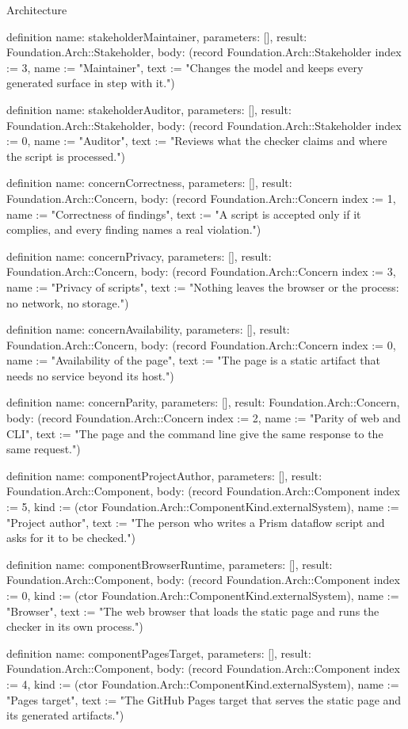 \begin{lexlean}{Architecture}
\begin{semanticmodule}
definition{
  name: stakeholderMaintainer,
  parameters: [],
  result: Foundation.Arch::Stakeholder,
  body: (record Foundation.Arch::Stakeholder {index := 3, name := "Maintainer", text := "Changes the model and keeps every generated surface in step with it."})
}

definition{
  name: stakeholderAuditor,
  parameters: [],
  result: Foundation.Arch::Stakeholder,
  body: (record Foundation.Arch::Stakeholder {index := 0, name := "Auditor", text := "Reviews what the checker claims and where the script is processed."})
}

definition{
  name: concernCorrectness,
  parameters: [],
  result: Foundation.Arch::Concern,
  body: (record Foundation.Arch::Concern {index := 1, name := "Correctness of findings", text := "A script is accepted only if it complies, and every finding names a real violation."})
}

definition{
  name: concernPrivacy,
  parameters: [],
  result: Foundation.Arch::Concern,
  body: (record Foundation.Arch::Concern {index := 3, name := "Privacy of scripts", text := "Nothing leaves the browser or the process: no network, no storage."})
}

definition{
  name: concernAvailability,
  parameters: [],
  result: Foundation.Arch::Concern,
  body: (record Foundation.Arch::Concern {index := 0, name := "Availability of the page", text := "The page is a static artifact that needs no service beyond its host."})
}

definition{
  name: concernParity,
  parameters: [],
  result: Foundation.Arch::Concern,
  body: (record Foundation.Arch::Concern {index := 2, name := "Parity of web and CLI", text := "The page and the command line give the same response to the same request."})
}

definition{
  name: componentProjectAuthor,
  parameters: [],
  result: Foundation.Arch::Component,
  body: (record Foundation.Arch::Component {index := 5, kind := (ctor Foundation.Arch::ComponentKind.externalSystem), name := "Project author", text := "The person who writes a Prism dataflow script and asks for it to be checked."})
}

definition{
  name: componentBrowserRuntime,
  parameters: [],
  result: Foundation.Arch::Component,
  body: (record Foundation.Arch::Component {index := 0, kind := (ctor Foundation.Arch::ComponentKind.externalSystem), name := "Browser", text := "The web browser that loads the static page and runs the checker in its own process."})
}

definition{
  name: componentPagesTarget,
  parameters: [],
  result: Foundation.Arch::Component,
  body: (record Foundation.Arch::Component {index := 4, kind := (ctor Foundation.Arch::ComponentKind.externalSystem), name := "Pages target", text := "The GitHub Pages target that serves the static page and its generated artifacts."})
}


\end{semanticmodule}
\end{lexlean}
